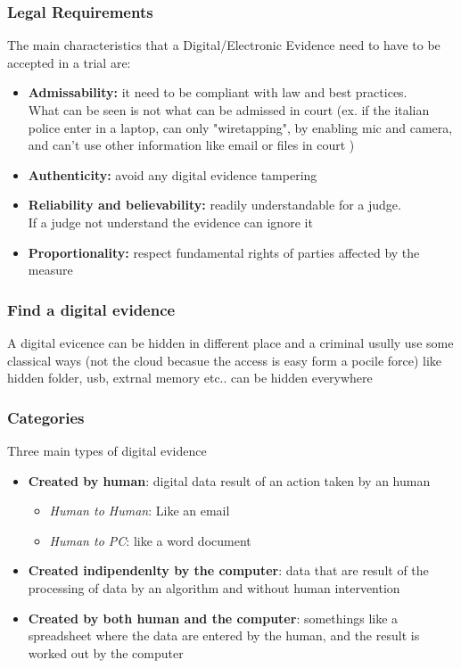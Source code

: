 \subsubsection{Legal Requirements}
The main characteristics that a Digital/Electronic Evidence need to have to be accepted in a trial are:
\begin{itemize}
  \item \textbf{Admissability:} it need to be compliant with law and best practices. \\
    What can be seen is not what can be admissed in court (ex. if the italian police enter in a laptop,
      can only "wiretapping", by enabling mic and camera,
    and can't use other information like email or files in court )
  \item \textbf{Authenticity:} avoid any digital evidence tampering
  \item \textbf{Reliability and believability:} readily understandable for a judge. \\
    If a judge not understand the evidence can ignore it
  \item \textbf{Proportionality:} respect fundamental rights of parties affected by the measure
\end{itemize}

\subsubsection{Find a digital evidence}
A digital evicence can be hidden in different place and a criminal usully use some classical ways
(not the cloud becasue the access is easy form a pocile force)
like hidden folder, usb, extrnal memory etc.. can be hidden everywhere

\subsubsection{Categories}
Three main types of digital evidence
\begin{itemize}
  \item \textbf{Created by human}: digital data result of an action taken by an human
    \begin{itemize}
      \item \textit{Human to Human}: Like an email
      \item \textit{Human to PC}: like a word document
    \end{itemize}
  \item \textbf{Created indipendenlty by the computer}: data that are result of
    the processing of data by an algorithm and without human intervention
  \item \textbf{Created by both human and the computer}: somethings like a spreadsheet where the data
    are entered by the human, and the result is worked out by the computer
\end{itemize}

